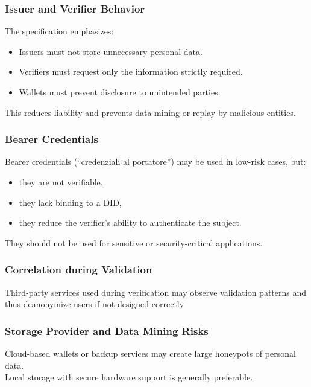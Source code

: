 \subsubsection *{Issuer and Verifier Behavior}

The specification emphasizes:

\begin{itemize}
    \item Issuers must not store unnecessary personal data.
    \item Verifiers must request only the information strictly required.
    \item Wallets must prevent disclosure to unintended parties.
\end{itemize}

\noindent
This reduces liability and prevents data mining or replay by malicious entities.

\subsubsection *{Bearer Credentials}

Bearer credentials (``credenziali al portatore'') may be used in low-risk cases, but:

\begin{itemize}
    \item they are not verifiable,
    \item they lack binding to a DID,
    \item they reduce the verifier’s ability to authenticate the subject.
\end{itemize}

\noindent
They should not be used for sensitive or security-critical applications.

\subsubsection *{Correlation during Validation}

Third-party services used during verification may observe validation patterns and thus deanonymize users if not designed correctly

\subsubsection *{Storage Provider and Data Mining Risks}

Cloud-based wallets or backup services may create large honeypots of personal data.\\
Local storage with secure hardware support is generally preferable.

